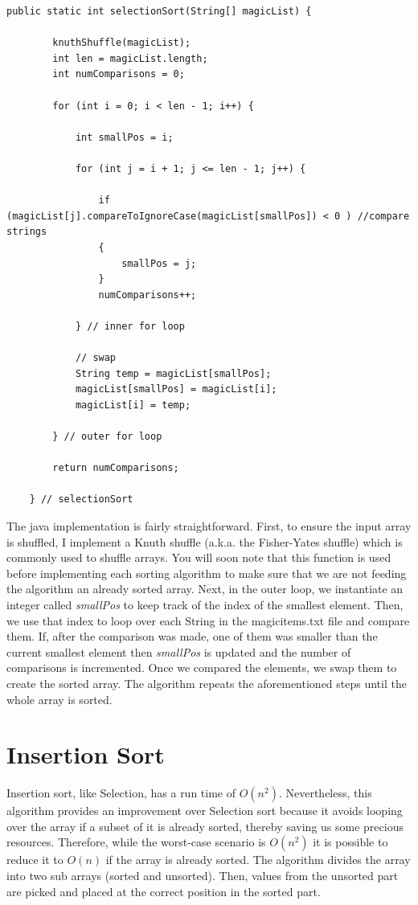 \documentclass[letterpaper, 10pt]{article}
\begin{document}
\begin{lstlisting}
public static int selectionSort(String[] magicList) {
		
		knuthShuffle(magicList);
		int len = magicList.length;
		int numComparisons = 0;
		
		for (int i = 0; i < len - 1; i++) {
			
			int smallPos = i;
			
			for (int j = i + 1; j <= len - 1; j++) {
				
				if (magicList[j].compareToIgnoreCase(magicList[smallPos]) < 0 ) //compare strings
				{	
					smallPos = j;
				}
				numComparisons++;
						
			} // inner for loop
			
			// swap
			String temp = magicList[smallPos];
			magicList[smallPos] = magicList[i];
			magicList[i] = temp;
			
		} // outer for loop
		
		return numComparisons;
		
	} // selectionSort
\end{lstlisting}

The java implementation is fairly straightforward. First, to ensure the input array is shuffled, I implement a Knuth shuffle (a.k.a. the Fisher-Yates shuffle) which is commonly used to shuffle arrays. You will soon note that this function is used before implementing each sorting algorithm to make sure that we are not feeding the algorithm an already sorted array. Next, in the outer loop, we instantiate an integer called \textit{smallPos} to keep track of the index of the smallest element. Then, we use that index to loop over each String in the magicitems.txt file and compare them. If, after the comparison was made, one of them was smaller than the current smallest element then \textit{smallPos} is updated and the number of comparisons is incremented. Once we compared the elements, we swap them to create the sorted array. The algorithm repeats the aforementioned steps until the whole array is sorted.
\pagebreak
\section{Insertion Sort}

Insertion sort, like Selection, has a run time of $O(n^2)$. Nevertheless, this algorithm provides an improvement over Selection sort because it avoids looping over the array if a subset of it is already sorted, thereby saving us some precious resources. Therefore, while the worst-case scenario is $O(n^2)$ it is possible to reduce it to $O(n)$ if the array is already sorted. The algorithm divides the array into two sub arrays (sorted and unsorted). Then, values from the unsorted part are picked and placed at the correct position in the sorted part.
\end{document}
